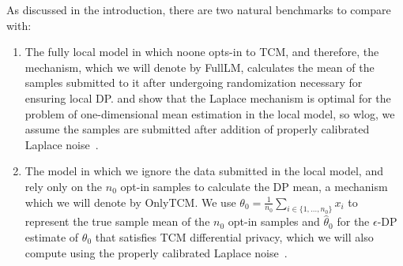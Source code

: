 \documentclass{article}
\newcommand\TODO[1]{\textcolor{red}{TODO: {#1}}}
\theoremstyle{plain}
\begin{document}
As discussed in the introduction, there are two natural benchmarks to compare with:
\begin{enumerate}
\item The fully local model in which noone opts-in to TCM, and therefore, the mechanism, which we will denote by FullLM, calculates the mean of the samples submitted to it after undergoing randomization necessary for ensuring local DP. \cite{duchi} and \cite{dky18} show that the Laplace mechanism is optimal for the problem of one-dimensional mean estimation in the local model, so wlog, we assume the samples are submitted after addition of properly calibrated Laplace noise~\cite{dmns06}. %
\item The model in which we ignore the data submitted in the local model, and rely only on the $n_0$ opt-in samples to calculate the DP mean, a mechanism which we will denote by OnlyTCM. We use $\theta_0 = \frac{1}{n_0}\sum_{i \in \{1, \dots, n_0\}} x_i$ to represent the true sample mean of the $n_0$ opt-in samples and $\hat{\theta}_0$ for the $\epsilon$-DP estimate of $\theta_0$ that satisfies TCM differential privacy, which we will also compute using the properly calibrated Laplace noise~\cite{dmns06}.
\end{enumerate}  

\end{document}
